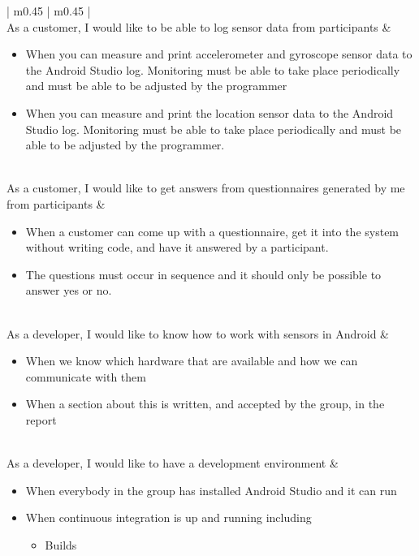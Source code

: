 \begin{center}
\begin{longtable}{| m{} | m{} |}
	 \\ \hline
	As a customer, I would like to be able to log sensor data from participants & 
	\begin{itemize}[noitemsep,topsep=0pt,parsep=0pt,partopsep=0pt]
	 	\item When you can measure and print accelerometer and gyroscope sensor data to the Android Studio log. Monitoring must be able to take place periodically and must be able to be adjusted by the programmer
	 	\item When you can measure and print the location sensor data to the Android Studio log. Monitoring must be able to take place periodically and must be able to be adjusted by the programmer.
	 \end{itemize} \\ \hline
	As a customer, I would like to get answers from questionnaires generated by me from participants & 
	\begin{itemize}[noitemsep,topsep=0pt,parsep=0pt,partopsep=0pt]
	 	\item When a customer can come up with a questionnaire, get it into the system without writing code, and have it answered by a participant.
	 	\item The questions must occur in sequence and it should only be possible to answer yes or no.
	 \end{itemize} \\ \hline
	As a developer, I would like to know how to work with sensors in Android & 
	\begin{itemize}[noitemsep,topsep=0pt,parsep=0pt,partopsep=0pt]
		\item When we know which hardware that are available and how we can communicate with them 
		\item When a section about this is written, and accepted by the group, in the report
	\end{itemize} \\ \hline
	As a developer, I would like to have a development environment & 
	\begin{itemize}[noitemsep,topsep=0pt,parsep=0pt,partopsep=0pt]
		\item When everybody in the group has installed Android Studio and it can run
		\item When continuous integration is up and running including 
			\begin{itemize}[noitemsep,topsep=0pt,parsep=0pt,partopsep=0pt]
				\item Builds

\end{itemize}
\end{itemize}
\end{longtable}
\end{center}
